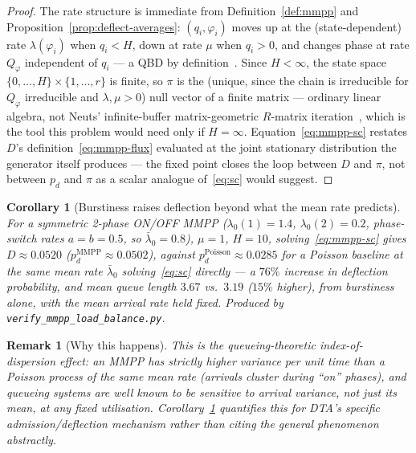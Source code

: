 \documentclass[11pt,a4paper]{report}
\newtheorem{corollary}[theorem]{Corollary}
\newtheorem{remark}{Remark}[section]
\begin{document}
\begin{proof}
The rate structure is immediate from Definition~\ref{def:mmpp} and
Proposition~\ref{prop:deflect-averages}: $(q_i,\varphi_i)$ moves up at
the (state-dependent) rate $\lambda(\varphi_i)$ when $q_i<H$, down at
rate $\mu$ when $q_i>0$, and changes phase at rate $Q_\varphi$
independent of $q_i$ --- a QBD by definition~\cite{neuts1981}. Since
$H<\infty$, the state space $\{0,\ldots,H\}\times\{1,\ldots,r\}$ is
finite, so $\pi$ is the (unique, since the chain is irreducible for
$Q_\varphi$ irreducible and $\lambda,\mu>0$) null vector of a finite
matrix --- ordinary linear algebra, not Neuts' infinite-buffer
matrix-geometric $R$-matrix iteration~\cite{neuts1981,latouche1999},
which is the tool this problem would need only if $H=\infty$.
Equation~\eqref{eq:mmpp-sc} restates $D$'s definition~\eqref{eq:mmpp-flux}
evaluated at the joint stationary distribution the generator itself
produces --- the fixed point closes the loop between $D$ and $\pi$,
not between $p_d$ and $\pi$ as a scalar analogue of~\eqref{eq:sc}
would suggest.
\end{proof}

\begin{corollary}[Burstiness raises deflection beyond what the mean rate predicts]
\label{cor:mmpp-numeric}
For a symmetric 2-phase ON/OFF MMPP ($\lambda_0(1)=1.4$,
$\lambda_0(2)=0.2$, phase-switch rates $a=b=0.5$, so
$\bar\lambda_0=0.8$), $\mu=1$, $H=10$, solving~\eqref{eq:mmpp-sc}
gives $D \approx 0.0520$ ($p_d^{\mathrm{MMPP}} \approx 0.0502$), against
$p_d^{\mathrm{Poisson}} \approx 0.0285$ for a Poisson baseline at the
\emph{same mean rate} $\bar\lambda_0$ solving~\eqref{eq:sc} directly
--- a $76\%$ increase in deflection probability, and mean
queue length $3.67$ vs.\ $3.19$ ($15\%$ higher), from burstiness alone,
with the mean arrival rate held fixed. Produced by
\texttt{verify\_mmpp\_load\_balance.py}.
\end{corollary}

\begin{remark}[Why this happens]
This is the queueing-theoretic index-of-dispersion effect: an MMPP has
strictly higher variance per unit time than a Poisson process of the
same mean rate (arrivals cluster during ``on'' phases), and queueing
systems are well known to be sensitive to arrival variance, not just
its mean, at any fixed utilisation. Corollary~\ref{cor:mmpp-numeric}
quantifies this for DTA's specific admission/deflection mechanism
rather than citing the general phenomenon abstractly.
\end{remark}
\end{document}
